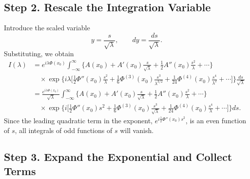 \documentclass[11pt]{article}
\begin{document}
\subsection*{Step 2. Rescale the Integration Variable}

Introduce the scaled variable
\[
y=\frac{s}{\sqrt{\lambda}},\qquad dy=\frac{ds}{\sqrt{\lambda}}.
\]
Substituting, we obtain
\[
\begin{aligned}
I(\lambda)&= e^{i\lambda\Phi(x_0)} \int_{-\infty}^{\infty} \Biggl\{ A(x_0)+A'(x_0)\frac{s}{\sqrt{\lambda}}+\frac{1}{2}A''(x_0)\frac{s^2}{\lambda}+\cdots \Biggr\} \\
&\quad \times \exp\Biggl\{ i\lambda \Biggl[\frac{1}{2}\Phi''(x_0)\frac{s^2}{\lambda}+\frac{1}{6}\Phi^{(3)}(x_0)\frac{s^3}{\lambda^{3/2}}+\frac{1}{24}\Phi^{(4)}(x_0)\frac{s^4}{\lambda^2}+\cdots \Biggr]\Biggr\}\frac{ds}{\sqrt{\lambda}}\\[1mm]
&=\frac{e^{i\lambda\Phi(x_0)}}{\sqrt{\lambda}} \int_{-\infty}^{\infty} \Biggl\{ A(x_0)+A'(x_0)\frac{s}{\sqrt{\lambda}}+\frac{1}{2}A''(x_0)\frac{s^2}{\lambda}+\cdots \Biggr\} \\
&\quad \times \exp\Biggl\{ i\Biggl[\frac{1}{2}\Phi''(x_0)s^2+\frac{1}{6}\Phi^{(3)}(x_0)\frac{s^3}{\sqrt{\lambda}}+\frac{1}{24}\Phi^{(4)}(x_0)\frac{s^4}{\lambda}+\cdots \Biggr]\Biggr\} ds.
\end{aligned}
\]
Since the leading quadratic term in the exponent, $e^{i\frac{1}{2}\Phi''(x_0)s^2}$, is an even function of $s$, all integrals of odd functions of $s$ will vanish.

\subsection*{Step 3. Expand the Exponential and Collect Terms}
\end{document}
